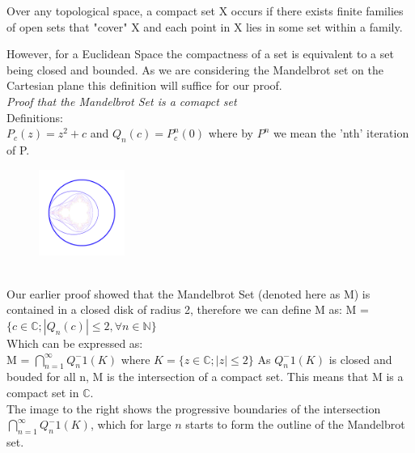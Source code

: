 \documentclass[a4wide, 10pt]{article}
\begin{document}





Over any topological space, a compact set X occurs if there exists finite 
families of open sets that "cover" X and each point in X lies in some set within a family. 


However, for a Euclidean Space the compactness of a set is equivalent to a set being closed and bounded. \cite{compactness} As we are considering the Mandelbrot set on the Cartesian plane this definition will suffice for our proof.\\
\emph{Proof that the Mandelbrot Set is a comapct set} \cite{compact proof}
\\Definitions:
\\$P_{c}(z) = z^2 + c$ and $Q_{n}(c) = P^n_{c}(0)$ where by $P^n$ we mean the 'nth' iteration of P.\\
\begin{figure}
  \begin{center}
\includegraphics[width = 0.25\textwidth]{Compact/compact.png}
\vspace{-40pt}
\end{center}
\end{figure}
\\Our earlier proof showed that the Mandelbrot Set (denoted here as M) is contained in a closed disk of radius 2, therefore we can define M as: 
M =  $ \{ c \in \mathbb{C}; |Q_{n}(c)| \leq 2,  \forall n \in \mathbb{N}  \} $
\\Which can be expressed as:
\\ M = $\bigcap _{n=1}^\infty Q_{n}^-1(K)$ where $K = \{ z \in \mathbb{C}; |z| \leq 2 \}$
As $Q_{n}^-1(K)$ is closed and bouded for all n, M is the intersection of a compact set. This means that M is a compact set in $\mathbb{C}$.
\\The image to the right shows the progressive boundaries of the intersection $\bigcap _{n=1}^\infty Q_{n}^-1(K)$, which for large $n$ starts to form the outline of the Mandelbrot set. 
\end{document}
